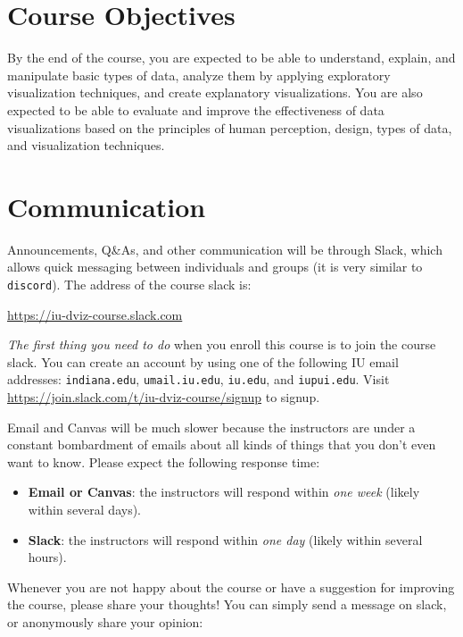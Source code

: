 \documentclass[11pt,article,oneside]{memoir} %
\begin{document}
\section{Course Objectives}%

By the end of the course, you are expected to be able to understand, explain, and manipulate basic types of data, analyze them by applying exploratory visualization techniques, and create explanatory visualizations. 
You are also expected to be able to evaluate and improve the effectiveness of data visualizations based on the principles of human perception, design, types of data, and visualization techniques. 
 

\section{Communication} %

Announcements, Q\&As, and other communication will be through Slack, which allows quick messaging between individuals and groups (it is very similar to \texttt{discord}). The address of the course slack is: 

\url{https://iu-dviz-course.slack.com}

\emph{The first thing you need to do} when you enroll this course is to join the course slack. You can create an account by using one of the following IU email addresses: \texttt{indiana.edu}, \texttt{umail.iu.edu}, \texttt{iu.edu}, and \texttt{iupui.edu}. Visit \url{https://join.slack.com/t/iu-dviz-course/signup} to signup.

Email and Canvas will be much slower because the instructors are under a constant bombardment of emails about all kinds of things that you don't even want to know. Please expect the following response time:

\begin{itemize}
\item \textbf{Email or Canvas}: the instructors will respond within \emph{one week} (likely within several days).
\item \textbf{Slack}: the instructors will respond within \emph{one day} (likely within several hours).

\end{itemize}

Whenever you are not happy about the course or have a suggestion for improving the course, please share your thoughts! You can simply send a message on slack, or anonymously share your opinion:
\end{document}
